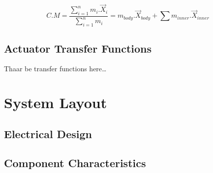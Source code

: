\begin{subequations}
\label{eq:mass-center}
\begin{equation}\label{eq:mass-center.a}
C.M = \frac{\sum_{i=1}^{n} m_i.\vec{X}_i}{\sum_{i=1}^{n} m_i}
\end{equation}
\begin{equation}\label{eq:mass-center.b}
=m_{body}.\vec{X}_{body}+\sum m_{inner}.\vec{X}_{inner}
\end{equation}
\end{subequations}

\subsection{Actuator Transfer Functions}
\label{subsec:proto.design.transfer}
Thaar be transfer functions here\ldots
\section{System Layout}
\label{sec:proto.layout}
\subsection{Electrical Design}
\subsection{Component Characteristics}